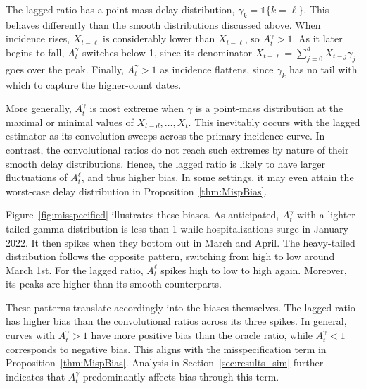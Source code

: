 \documentclass{article}
\begin{document}
The lagged ratio has a point-mass delay distribution, $\gamma_k=\mathds{1}\{k=\ell\}$. This behaves  differently than the smooth distributions discussed above. When incidence rises, $X_{t-\ell}$ is considerably lower than $X_{t-\ell}$, so $A_t^\gamma>1$. As it later begins to fall, $A_t^\gamma$ switches below 1, since its denominator $X_{t-\ell}={\sum_{j=0}^d X_{t-j}\gamma_j}$ goes over the peak. Finally, $A_t^\gamma > 1$ as incidence flattens, since $\gamma_k$ has no tail with which to capture the higher-count dates. 


More generally, $A_t^\gamma$ is most extreme when $\gamma$ is a point-mass distribution at the maximal or minimal values of $X_{t-d}, \ldots, X_t$. This inevitably occurs with the lagged estimator as its convolution sweeps across the primary incidence curve. In contrast, the convolutional ratios do not reach such extremes by nature of their smooth delay distributions. 
Hence, the lagged ratio is likely to have larger fluctuations of $A_t^\ell$, and thus higher bias.
In some settings, it may even attain the worst-case delay distribution in Proposition~\ref{thm:MispBias}. 

Figure~\ref{fig:misspecified} illustrates these biases. As anticipated, $A_t^\gamma$ with a lighter-tailed gamma distribution is less than 1 while hospitalizations surge in January 2022. It then spikes when they bottom out in March and April. The heavy-tailed distribution follows the opposite pattern, switching from high to low around March 1st. For the lagged ratio, $A_t^\ell$ spikes high to low to high again. Moreover, its peaks are higher than its smooth counterparts.

These patterns translate accordingly into the biases themselves. The lagged ratio has higher bias than the convolutional ratios across its three spikes. In general, curves with $A_t^\gamma>1$ have more positive bias than the oracle ratio, while $A_t^\gamma<1$ corresponds to negative bias. This aligns with the misspecification term in Proposition~\ref{thm:MispBias}. Analysis in Section~\ref{sec:results_sim} further indicates that $A_t^\gamma$ predominantly affects bias through this term. 
\end{document}
